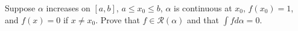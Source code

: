 \begin{exercise}
	Suppose $\alpha$ increases on $\left[ a, b \right]$, $a \leq x_0 \leq b$, $\alpha$ is continuous at $x_0$, $f \left( x_0 \right) = 1$, and $f \left( x \right) = 0$ if $x \neq x_0$. Prove that $f \in \mathscr{R} \left( \alpha \right)$ and that $\int f d\alpha = 0$.
\end{exercise}

